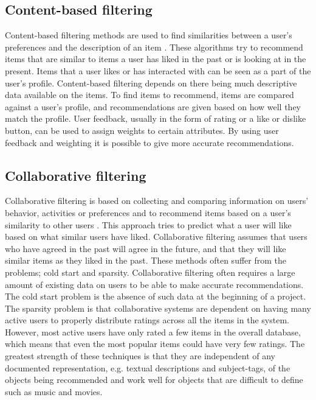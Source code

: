 \subsection{Content-based filtering}

Content-based filtering methods are used to find similarities between a user's preferences and the description of an item \cite{HM5}. These algorithms try to recommend items that are similar to items a user has liked in the past or is looking at in the present. Items that a user likes or has interacted with can be seen as a part of the user's profile. Content-based filtering depends on there being much descriptive data available on the items. To find items to recommend, items are compared against a user's profile, and recommendations are given based on how well they match the profile. User feedback, usually in the form of rating or a like or dislike button, can be used to assign weights to certain attributes. By using user feedback and weighting it is possible to give more accurate recommendations. \cite{HM4}

\subsection{Collaborative filtering}

Collaborative filtering is based on collecting and comparing information on users' behavior, activities or preferences and to recommend items based on a user's similarity to other users \cite{HM6}. This approach tries to predict what a user will like based on what similar users have liked. Collaborative filtering assumes that users who have agreed in the past will agree in the future, and that they will like similar items as they liked in the past. These methods often suffer from the problems; cold start and sparsity. Collaborative filtering often requires a large amount of existing data on users to be able to make accurate recommendations. The cold start problem is the absence of such data at the beginning of a project. The sparsity problem is that collaborative systems are dependent on having many active users to properly distribute ratings across all the items in the system. However, most active users have only rated a few items in the overall database, which means that even the most popular items could have very few ratings. The greatest strength of these techniques is that they are independent of any documented representation, e.g. textual descriptions and subject-tags, of the objects being recommended and work well for objects that are difficult to define such as music and movies.\cite{HM4}

